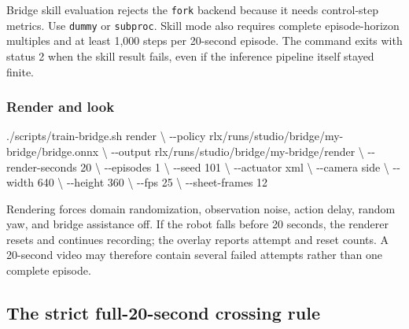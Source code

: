 \documentclass[
  american,
  11pt,
  letterpaper,
]{article}
\newenvironment{Shaded}{\begin{snugshade}}{\end{snugshade}}
\newcommand{\AttributeTok}[1]{\textcolor[rgb]{0.13,0.29,0.53}{#1}}
\newcommand{\DataTypeTok}[1]{\textcolor[rgb]{0.13,0.29,0.53}{#1}}
\newcommand{\ExtensionTok}[1]{#1}
\newcommand{\NormalTok}[1]{#1}
\renewenvironment{Shaded}{\par\smallskip}{\par\smallskip}
\begin{document}
Bridge skill evaluation rejects the \texttt{fork} backend because it
needs control-step metrics. Use \texttt{dummy} or \texttt{subproc}.
Skill mode also requires complete episode-horizon multiples and at least
1,000 steps per 20-second episode. The command exits with status 2 when
the skill result fails, even if the inference pipeline itself stayed
finite.

\subsubsection{Render and look}\label{render-and-look}

\begin{Shaded}
\begin{Highlighting}[]
\ExtensionTok{./scripts/train{-}bridge.sh}\NormalTok{ render }\DataTypeTok{\textbackslash{}}
  \AttributeTok{{-}{-}policy}\NormalTok{ rlx/runs/studio/bridge/my{-}bridge/bridge.onnx }\DataTypeTok{\textbackslash{}}
  \AttributeTok{{-}{-}output}\NormalTok{ rlx/runs/studio/bridge/my{-}bridge/render }\DataTypeTok{\textbackslash{}}
  \AttributeTok{{-}{-}render{-}seconds}\NormalTok{ 20 }\DataTypeTok{\textbackslash{}}
  \AttributeTok{{-}{-}episodes}\NormalTok{ 1 }\DataTypeTok{\textbackslash{}}
  \AttributeTok{{-}{-}seed}\NormalTok{ 101 }\DataTypeTok{\textbackslash{}}
  \AttributeTok{{-}{-}actuator}\NormalTok{ xml }\DataTypeTok{\textbackslash{}}
  \AttributeTok{{-}{-}camera}\NormalTok{ side }\DataTypeTok{\textbackslash{}}
  \AttributeTok{{-}{-}width}\NormalTok{ 640 }\DataTypeTok{\textbackslash{}}
  \AttributeTok{{-}{-}height}\NormalTok{ 360 }\DataTypeTok{\textbackslash{}}
  \AttributeTok{{-}{-}fps}\NormalTok{ 25 }\DataTypeTok{\textbackslash{}}
  \AttributeTok{{-}{-}sheet{-}frames}\NormalTok{ 12}
\end{Highlighting}
\end{Shaded}

Rendering forces domain randomization, observation noise, action delay,
random yaw, and bridge assistance off. If the robot falls before 20
seconds, the renderer resets and continues recording; the overlay
reports attempt and reset counts. A 20-second video may therefore
contain several failed attempts rather than one complete episode.

\subsection{The strict full-20-second crossing
rule}\label{the-strict-full-20-second-crossing-rule}
\end{document}
